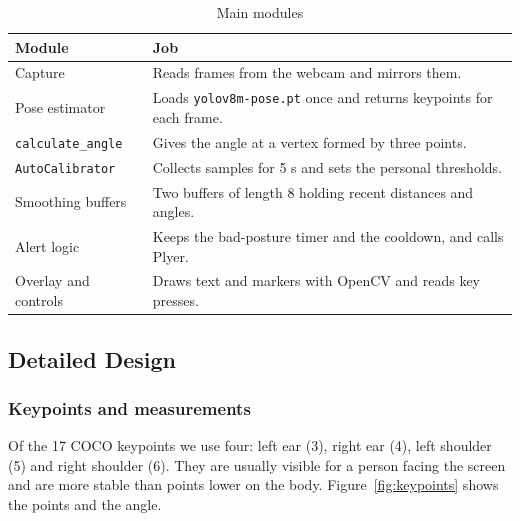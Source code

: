 ﻿\documentclass[12pt,a4paper]{article}
\begin{document}
\begin{table}[htpb]
\centering
\caption{Main modules}\label{tab:modules}
\renewcommand{\arraystretch}{1.25}
\begin{tabularx}{\textwidth}{@{}>{\raggedright\arraybackslash}p{3.6cm}Y@{}}
\toprule
\textbf{Module} & \textbf{Job}\\
\midrule
Capture & Reads frames from the webcam and mirrors them.\\
Pose estimator & Loads \texttt{yolov8m-pose.pt} once and returns keypoints for each frame.\\
\texttt{calculate\_angle} & Gives the angle at a vertex formed by three points.\\
\texttt{AutoCalibrator} & Collects samples for 5 s and sets the personal thresholds.\\
Smoothing buffers & Two buffers of length 8 holding recent distances and angles.\\
Alert logic & Keeps the bad-posture timer and the cooldown, and calls Plyer.\\
Overlay and controls & Draws text and markers with OpenCV and reads key presses.\\
\bottomrule
\end{tabularx}
\end{table}

\subsection{Detailed Design}

\subsubsection{Keypoints and measurements}
Of the 17 COCO keypoints we use four: left ear (3), right ear (4), left shoulder (5) and
right shoulder (6). They are usually visible for a person facing the screen and are more
stable than points lower on the body. Figure~\ref{fig:keypoints} shows the points and the
angle.
\end{document}
